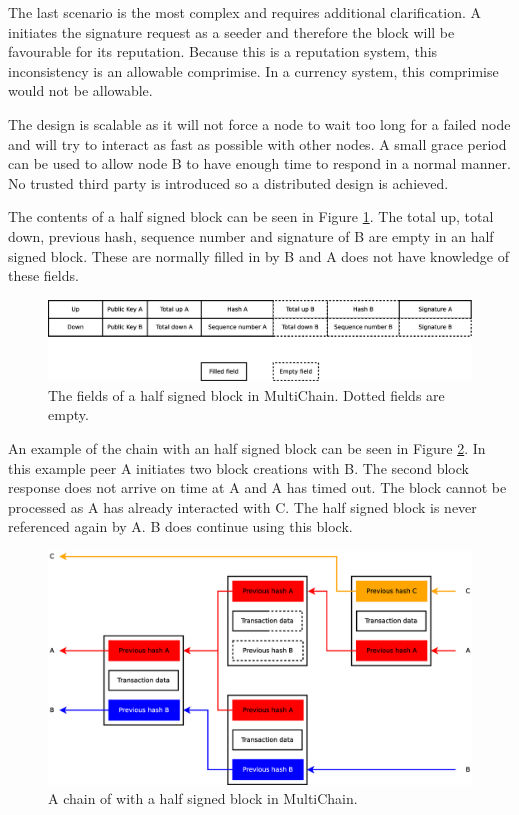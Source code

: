 The last scenario is the most complex and requires additional clarification.
A initiates the signature request as a seeder and therefore the block will be favourable for its reputation.
Because this is a reputation system, this inconsistency is an allowable comprimise.
In a currency system, this comprimise would not be allowable.

The design is scalable as it will not force a node to wait too long for a failed node
and will try to interact as fast as possible with other nodes.
A small grace period can be used to allow node B to have enough time to respond in a normal manner.
No trusted third party is introduced so a distributed design is achieved.

The contents of a half signed block can be seen in Figure \ref{fig:halfsigned-block}.
The total up, total down, previous hash, sequence number and signature of B are empty in an half signed block.
These are normally filled in by B and A does not have knowledge of these fields.

\begin{figure}
	\centerline{\includegraphics[scale=0.3]{design/figs/halfsigned-block.eps}}
	\caption{The fields of a half signed block in MultiChain. Dotted fields are empty.}
	\label{fig:halfsigned-block}
\end{figure}

An example of the chain with an half signed block can be seen in Figure \ref{fig:halfsigned-chain}.
In this example peer A initiates two block creations with B.
The second block response does not arrive on time at A and A has timed out.
The block cannot be processed as A has already interacted with C.
The half signed block is never referenced again by A.
B does continue using this block.

\begin{figure}
	\centerline{\includegraphics[scale=0.3]{design/figs/halfsigned-chain.eps}}
	\caption{A chain of with a half signed block in MultiChain.}
	\label{fig:halfsigned-chain}
\end{figure}